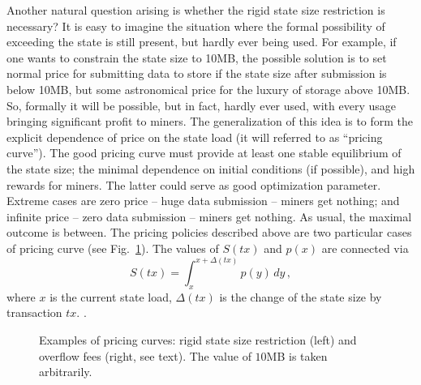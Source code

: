 \documentclass[]{llncs}   %
\newcommand{\authnote}[2]{\marginpar{\parbox{\marginparwidth}{\tiny %
  \textsf{#1 {\textcolor{blue}{notes: #2}}}}}%
  \textcolor{blue}{\textbf{\dag}}}
\newcommand{\authnote}[2]{
  \textsf{#1\textcolor{blue}{ #2}}}
\newcommand{\authnote}[2]{}
\newcommand{\vk}[1]{{\authnote{\textcolor{red}{V:}}{#1}}}
\begin{document}
Another natural question arising is whether the rigid state size restriction is
necessary?  It is easy to imagine the situation where the formal possibility of
exceeding the state is still present, but hardly ever being used. For example,
if one wants to constrain the state size to 10MB, the possible solution is to
set normal price for submitting data to store if the state size after submission
is below 10MB, but some astronomical price for the luxury of storage above 10MB.
So, formally it will be possible, but in fact, hardly ever used, with every
usage bringing significant profit to miners. The generalization of this idea is
to form the explicit dependence of price on the state load (it will referred to
as ``pricing curve''). The good pricing curve must provide at least one stable
equilibrium of the state size; the minimal dependence on initial conditions (if
possible), and high rewards for miners. The latter could serve as good
optimization parameter. Extreme cases are zero price -- huge data submission --
miners get nothing; and infinite price -- zero data submission -- miners get
nothing. As usual, the maximal outcome is between.  The pricing policies
described above are two particular cases of pricing curve (see
Fig.~\ref{fig:steps}). The values of $S(tx)$ and $p(x)$ are connected via
\begin{equation}
    S(tx)=\int_x^{x+\Delta(tx)}p(y)\,dy\,,
    \label{eq:Sp}
\end{equation}
where $x$ is the current state load, $\Delta(tx)$ is the change of the state
size by transaction $tx$. \vk{How to order transactions in the block? Is it Ok
to use the difference? What if it is negative?}.
\begin{figure} 
    \hfill 
    \hfill 
    \hfill 
    \caption{ 
        Examples of pricing curves: rigid state size restriction (left) and 
        overflow fees (right, see text). The value of $10$MB is taken 
        arbitrarily. 
        \label{fig:steps} 
    } 
\end{figure} 
\end{document}
